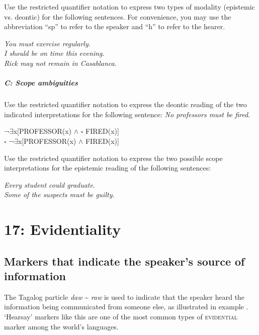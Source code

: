 Use the restricted quantifier notation to express two types of modality (epistemic vs. deontic) for the following sentences. For convenience, you may use the abbreviation “sp” to refer to the speaker and “h” to refer to the hearer.

\ea
\ea
\textit{You must exercise regularly}.\\
\ex \textit{I should be on time this evening}.\\
\ex \textit{Rick may not remain in Casablanca}.
\z
\z

\paragraph{C: Scope ambiguities}
\begin{exe}
 \ex \begin{xlisti}
  \ex Use the restricted quantifier notation to express the deontic reading of the two indicated interpretations for the following sentence: 
  \textit{No professors must be fired}.\\
  \begin{xlisti}
    \ex ¬${\exists}$x[PROFESSOR(x) $\wedge$ ${\square}$ FIRED(x)]\\
    \ex ${\square}$ ¬${\exists}$x[PROFESSOR(x) $\wedge$ FIRED(x)]
  \end{xlisti}
\ex  Use the restricted quantifier notation to express the two possible scope interpretations for the epistemic reading of the following sentences:\\
\begin{xlista}
 \ex \textit{Every student could graduate}.\\
 \ex \textit{Some of the suspects must be guilty}.
\end{xlista}
\end{xlisti}
\end{exe}

\chapter{{17}: Evidentiality}

\section{Markers that indicate the speaker’s source of information}\label{sec:} %

The Tagalog particle \textit{daw} {\textasciitilde} \textit{raw} is used to indicate that the speaker heard the information being communicated from someone else, as illustrated in example . ‘Hearsay’ markers like this are one of the most common types of \textsc{evidential} marker among the world’s languages.


